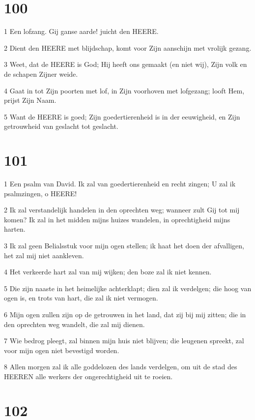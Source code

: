 \chapter{100}

\par 1 Een lofzang. Gij ganse aarde! juicht den HEERE.
\par 2 Dient den HEERE met blijdschap, komt voor Zijn aanschijn met vrolijk gezang.
\par 3 Weet, dat de HEERE is God; Hij heeft ons gemaakt (en niet wij), Zijn volk en de schapen Zijner weide.
\par 4 Gaat in tot Zijn poorten met lof, in Zijn voorhoven met lofgezang; looft Hem, prijst Zijn Naam.
\par 5 Want de HEERE is goed; Zijn goedertierenheid is in der eeuwigheid, en Zijn getrouwheid van geslacht tot geslacht.

\chapter{101}

\par 1 Een psalm van David. Ik zal van goedertierenheid en recht zingen; U zal ik psalmzingen, o HEERE!
\par 2 Ik zal verstandelijk handelen in den oprechten weg; wanneer zult Gij tot mij komen? Ik zal in het midden mijns huizes wandelen, in oprechtigheid mijns harten.
\par 3 Ik zal geen Belialsstuk voor mijn ogen stellen; ik haat het doen der afvalligen, het zal mij niet aankleven.
\par 4 Het verkeerde hart zal van mij wijken; den boze zal ik niet kennen.
\par 5 Die zijn naaste in het heimelijke achterklapt; dien zal ik verdelgen; die hoog van ogen is, en trots van hart, die zal ik niet vermogen.
\par 6 Mijn ogen zullen zijn op de getrouwen in het land, dat zij bij mij zitten; die in den oprechten weg wandelt, die zal mij dienen.
\par 7 Wie bedrog pleegt, zal binnen mijn huis niet blijven; die leugenen spreekt, zal voor mijn ogen niet bevestigd worden.
\par 8 Allen morgen zal ik alle goddelozen des lands verdelgen, om uit de stad des HEEREN alle werkers der ongerechtigheid uit te roeien.

\chapter{102}

